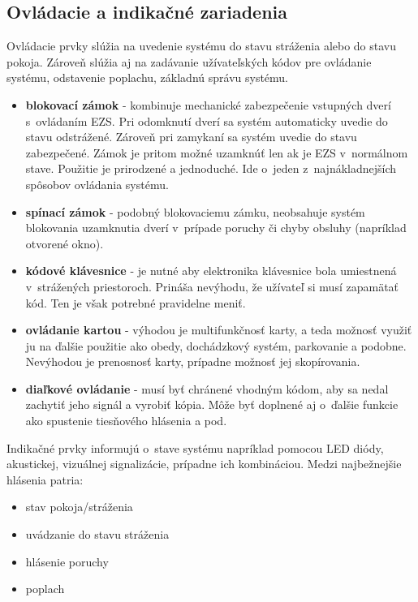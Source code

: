 \subsection{Ovládacie a indikačné zariadenia}

Ovládacie prvky slúžia na uvedenie systému do stavu stráženia alebo do stavu pokoja. Zároveň slúžia aj na zadávanie užívateľských kódov pre ovládanie systému, odstavenie poplachu, základnú správu systému.
\begin{itemize}
    \item \textbf{blokovací zámok} - kombinuje mechanické zabezpečenie vstupných dverí s~ovládaním EZS. Pri odomknutí dverí sa systém automaticky uvedie do stavu odstrážené. Zároveň pri zamykaní sa systém uvedie do stavu zabezpečené. Zámok je pritom možné uzamknúť len ak je EZS v~normálnom stave. Použitie je prirodzené a jednoduché. Ide o~jeden z~najnákladnejších spôsobov ovládania systému.
    \item \textbf{spínací zámok} - podobný blokovaciemu zámku, neobsahuje systém blokovania uzamknutia dverí v~prípade poruchy či chyby obsluhy (napríklad otvorené okno).
    \item \textbf{kódové klávesnice} - je nutné aby elektronika klávesnice bola umiestnená v~strážených priestoroch. Prináša nevýhodu, že užívateľ si musí zapamätať kód. Ten je však potrebné pravidelne meniť.
    \item \textbf{ovládanie kartou} - výhodou je multifunkčnosť karty, a teda možnosť využiť ju na ďalšie použitie ako obedy, dochádzkový systém, parkovanie a podobne. Nevýhodou je prenosnosť karty, prípadne možnosť jej skopírovania.
    \item \textbf{diaľkové ovládanie} - musí byť chránené vhodným kódom, aby sa nedal zachytiť jeho signál a vyrobiť kópia. Môže byť doplnené aj o~ďalšie funkcie ako spustenie tiesňového hlásenia a pod.\cite{velas_ezs}
\end{itemize}

Indikačné prvky informujú o~stave systému napríklad pomocou LED diódy, akustickej, vizuálnej signalizácie, prípadne ich kombináciou. Medzi najbežnejšie hlásenia patria:
\begin{itemize}
    \item stav pokoja/stráženia
    \item uvádzanie do stavu stráženia
    \item hlásenie poruchy
    \item poplach
\end{itemize}

